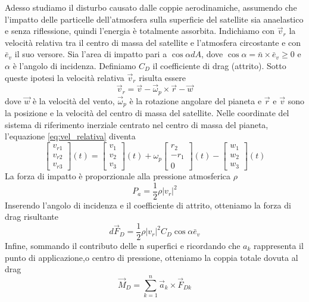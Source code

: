 Adesso studiamo il disturbo causato dalle coppie aerodinamiche, assumendo che
l'impatto delle particelle dell'atmosfera sulla superficie del satellite sia
anaelastico e senza riflessione, quindi l'energia è totalmente assorbita.
Indichiamo con $\vec{v}_r$ la velocità relativa tra il centro di massa del
satellite e l'atmosfera circostante e con $\bar{e}_v$ il suo versore. Sia l'area
di impatto pari a $\cos\alpha dA$, dove $\cos\alpha=\bar{n}\times\bar{e}_v\geq
0$ e $\alpha$ è l'angolo di incidenza. Definiamo $C_D$ il coefficiente di drag
(attrito).
Sotto queste ipotesi la velocità relativa $\vec{v}_r$ risulta essere
\begin{equation}
\vec{v}_r=\vec{v}-\vec{\omega}_p\times\vec{r}-\vec{w}
\label{eq:vel_relativa}
\end{equation}
dove $\vec{w}$ è la velocità del vento, $\vec{\omega}_p$ è la rotazione angolare
del pianeta e $\vec{r}$ e $\vec{v}$ sono la posizione e la velocità del centro
di massa del satellite.
Nelle coordinate del sistema di riferimento inerziale centrato nel centro di
massa del pianeta, l'equazione \ref{eq:vel_relativa} diventa
\begin{equation}
\begin{bmatrix}
v_{r1} \\ v_{r2} \\ v_{r3}
\end{bmatrix} (t) = 
\begin{bmatrix}
v_1 \\ v_2 \\ v_3
\end{bmatrix}
(t) + \omega_p
\begin{bmatrix}
r_2 \\ -r_1 \\ 0
\end{bmatrix}(t) -
\begin{bmatrix}
w_1 \\ w_2 \\ w_3
\end{bmatrix}(t)
\end{equation}
La forza di impatto è proporzionale alla pressione atmosferica $\rho$
\begin{equation}
P_a=\frac{1}{2}\rho|v_r|^2
\end{equation}
Inserendo l'angolo di incidenza e il coefficiente di attrito, otteniamo la forza
di drag risultante
\begin{equation}
d\vec{F}_D=\frac{1}{2}\rho|v_r|^2C_D\cos\alpha\bar{e}_v
\end{equation}
Infine, sommando il contributo delle n superfici e ricordando che $a_k$
rappresenta il punto di applicazione,o centro di pressione, otteniamo la coppia
totale dovuta al drag
\begin{equation}
\vec{M}_D=\sum_{k=1}^n\vec{a}_k\times\vec{F}_{Dk}
\end{equation}
